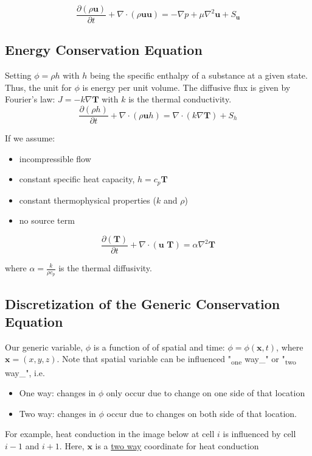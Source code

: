 \documentclass[11pt]{article}
\begin{document}
\begin{equation}
\frac{\partial (\rho \textbf{u})}{\partial t} + \nabla \cdot (\rho \textbf{uu})  = -\nabla p + \mu \nabla^2
\textbf{u} + S_\textbf{u}
\end{equation}

\subsection{Energy Conservation Equation}
\label{sec:org689f268}
Setting \(\phi = \rho h\) with \(h\) being the specific enthalpy of a substance at a given state. Thus, the unit for \(\phi\) is
energy per unit volume. The diffusive flux is given by Fourier's law: \(J = -k \nabla \textbf{T}\) with \(k\) is the thermal conductivity.
\begin{equation}
\frac{\partial (\rho h)}{\partial t} + \nabla \cdot (\rho \textbf{u} h)  = \nabla \cdot (k \nabla \textbf{T}) +
S_h
\end{equation}

If we assume:
\begin{itemize}
\item incompressible flow
\item constant specific heat capacity, \(h = c_p \textbf{T}\)
\item constant thermophysical properties (\(k\) and \(\rho\))
\item no source term
\end{itemize}

\begin{equation}
\frac{\partial (\textbf{T})}{\partial t} + \nabla \cdot (\textbf{u T})  = \alpha \nabla ^2 \textbf{T}
\end{equation}

where \(\alpha = \frac{k}{\rho c_p}\) is the thermal diffusivity. 

\subsection{Discretization of the Generic Conservation Equation}
\label{sec:org1896970}
Our generic variable, \(\phi\) is a function of of spatial and time: \(\phi = \phi (\textbf{x},t)\), where
\(\textbf{x} = (x,y,z)\). Note that spatial variable can be influenced "\textsubscript{one} way\_" or "\textsubscript{two} way\_", i.e.
\begin{itemize}
\item One way: changes in \(\phi\) only occur due to change on one side of that location
\item Two way: changes in \(\phi\) occur due to changes on both side of that location.
\end{itemize}
For example, heat conduction in the image below at cell \(i\) is influenced by cell \(i-1\) and
\(i+1\). Here, \(\textbf{x}\) is a \uline{two way} coordinate for heat conduction
\end{document}
